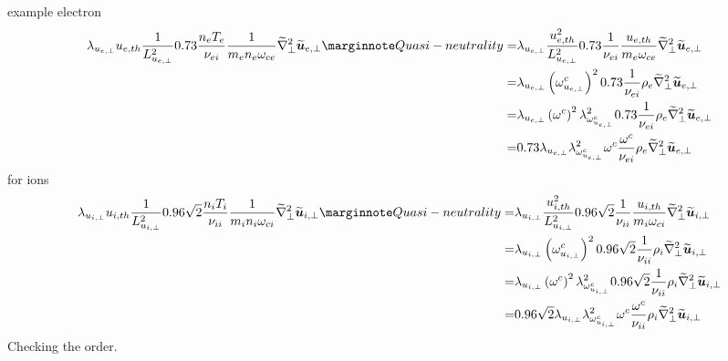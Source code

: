 %
example electron
%
\begin{align*}
 \lambda_{u_{e,\perp}}u_{e,th}
\frac{1}{L_{u_{e,\perp}}^2}
0.73\frac{n_eT_e}{\nu_{ei}}
\frac{1}{m_e n_e \om_{ce}}
\wt{\grad}_\perp^2\wt{\ve{u}}_{e,\perp}
\note{Quasi-neutrality}
=&
 \lambda_{u_{e,\perp}}
\frac{u_{e,th}^2}{L_{u_{e,\perp}}^2}
0.73\frac{1}{\nu_{ei}}
\frac{u_{e,th}}{m_e\om_{ce}}
\wt{\grad}_\perp^2\wt{\ve{u}}_{e,\perp}
\\
%
%
=&
 \lambda_{u_{e,\perp}}
 \L(\om^c_{u_{e,\perp}}\R)^2
0.73\frac{1}{\nu_{ei} }
\rho_e
\wt{\grad}_\perp^2\wt{\ve{u}}_{e,\perp}
\\
%
%
=&
 \lambda_{u_{e,\perp}}
 \L(\om^c\R)^2\lambda_{\om^c_{u_{e,\perp}}}^2
0.73\frac{1}{\nu_{ei} }
\rho_e
\wt{\grad}_\perp^2\wt{\ve{u}}_{e,\perp}
\\
%
%
=&
0.73
 \lambda_{u_{e,\perp}}
\lambda_{\om^c_{u_{e,\perp}}}^2
 \om^c
\frac{\om^c}{\nu_{ei} }
\rho_e
\wt{\grad}_\perp^2\wt{\ve{u}}_{e,\perp}
\end{align*}
%
for ions
%
\begin{align*}
 \lambda_{u_{i,\perp}}u_{i,th}
\frac{1}{L_{u_{i,\perp}}^2}
0.96\sqrt{2}\frac{n_iT_i}{\nu_{ii}}
\frac{1}{m_i n_i \om_{ci}}
\wt{\grad}_\perp^2\wt{\ve{u}}_{i,\perp}
\note{Quasi-neutrality}
=&
 \lambda_{u_{i,\perp}}
\frac{u_{i,th}^2}{L_{u_{i,\perp}}^2}
0.96\sqrt{2}\frac{1}{\nu_{ii}}
\frac{u_{i,th}}{m_i\om_{ci}}
\wt{\grad}_\perp^2\wt{\ve{u}}_{i,\perp}
\\
%
%
=&
 \lambda_{u_{i,\perp}}
 \L(\om^c_{u_{i,\perp}}\R)^2
0.96\sqrt{2}\frac{1}{\nu_{ii} }
\rho_i
\wt{\grad}_\perp^2\wt{\ve{u}}_{i,\perp}
\\
%
%
=&
 \lambda_{u_{i,\perp}}
 \L(\om^c\R)^2\lambda_{\om^c_{u_{i,\perp}}}^2
0.96\sqrt{2}\frac{1}{\nu_{ii} }
\rho_i
\wt{\grad}_\perp^2\wt{\ve{u}}_{i,\perp}
\\
%
%
=&
0.96\sqrt{2}
 \lambda_{u_{i,\perp}}
\lambda_{\om^c_{u_{i,\perp}}}^2
 \om^c
\frac{\om^c}{\nu_{ii} }
\rho_i
\wt{\grad}_\perp^2\wt{\ve{u}}_{i,\perp}
\end{align*}
%
Checking the order.


